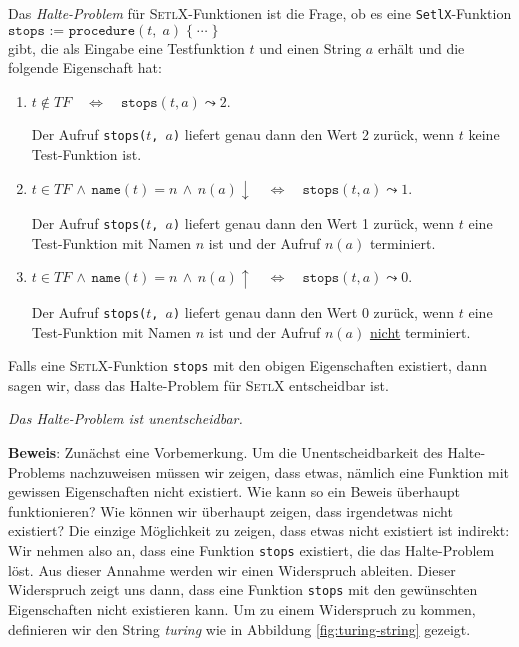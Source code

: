\noindent
Das \emph{Halte-Problem} f\"ur \textsc{SetlX}-Funktionen ist die Frage, ob es eine
\texttt{SetlX}-Funktion \\[0.1cm] 
\hspace*{1.3cm} 
$\texttt{stops := procedure}(t,\;a)\; \{\;\cdots\;\}$ \\[0.1cm]
gibt, die als Eingabe eine Testfunktion $t$ und einen String $a$ erh\"alt und die folgende
Eigenschaft hat:
\begin{enumerate}
\item $t \not\in T\!F \quad\Leftrightarrow\quad \mathtt{stops}(t, a) \leadsto 2$.

      Der Aufruf \texttt{stops($t$, $a$)} liefert genau dann den Wert 2 zur\"uck, 
      wenn $t$ keine Test-Funktion ist.

\item $t \in T\!F \,\wedge\, \mathtt{name}(t) = n \,\wedge\, n(a)\downarrow \quad\Leftrightarrow\quad
       \mathtt{stops}(t, a) \leadsto 1$.

      Der Aufruf \texttt{stops($t$, $a$)} liefert genau dann den Wert 1 zur\"uck,
      wenn $t$ eine Test-Funktion mit Namen $n$ ist und der Aufruf $n(a)$ terminiert.

\item $t \in T\!F \,\wedge\, \mathtt{name}(t) = n \,\wedge\, n(a)\uparrow \quad\Leftrightarrow\quad
       \mathtt{stops}(t, a) \leadsto 0$.

      Der Aufruf \texttt{stops($t$, $a$)} liefert genau dann den Wert 0 zur\"uck,
      wenn $t$ eine Test-Funktion mit Namen $n$ ist und der Aufruf $n(a)$ \underline{nicht} terminiert.
\end{enumerate}
Falls eine \textsc{SetlX}-Funktion \texttt{stops} mit den obigen Eigenschaften existiert, dann
sagen wir, dass das Halte-Problem f\"ur \textsc{SetlX} entscheidbar ist.

\begin{Theorem}[Turing, 1936]
{\em
  Das Halte-Problem ist unentscheidbar.
} 
\end{Theorem}

\noindent
\textbf{Beweis}:  Zun\"achst eine Vorbemerkung.  Um die Unentscheidbarkeit des
Halte-Problems nachzuweisen m\"ussen wir zeigen, dass etwas, n\"amlich eine Funktion mit
gewissen Eigenschaften nicht existiert.  Wie kann so ein Beweis \"uberhaupt funktionieren?
Wie k\"onnen wir \"uberhaupt zeigen, dass irgendetwas nicht existiert?
Die einzige M\"oglichkeit zu zeigen, dass etwas nicht existiert ist indirekt:
Wir nehmen also an, dass eine Funktion \texttt{stops} existiert, die das Halte-Problem l\"ost.
Aus dieser Annahme werden wir einen Widerspruch ableiten.  Dieser Widerspruch zeigt
uns dann, dass eine Funktion \texttt{stops} mit den gew\"unschten Eigenschaften nicht
existieren kann.
Um zu einem Widerspruch zu kommen, definieren wir den String \textsl{turing} wie in Abbildung
\ref{fig:turing-string} gezeigt.

